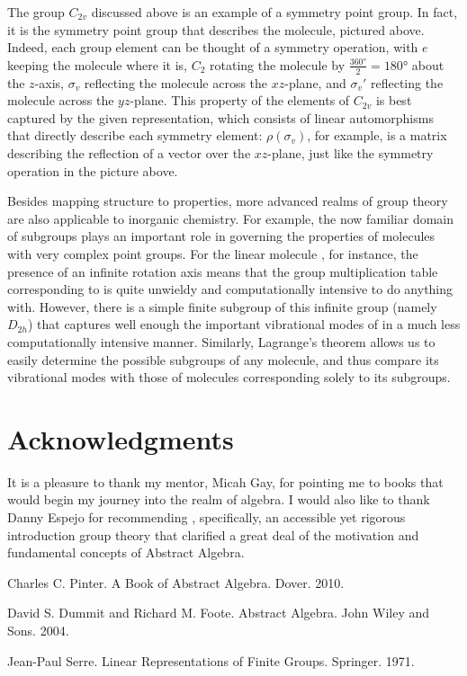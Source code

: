 \documentclass[openany, amssymb, psamsfonts]{amsart}
\theoremstyle{definition}
\numberwithin{equation}{section}
\begin{document}
The group $C_{2v}$ discussed above is an example of a symmetry point group. In fact, it is the symmetry point group that describes the  molecule, pictured above. Indeed, each group element can be thought of a symmetry operation, with $e$ keeping the molecule where it is, $C_2$ rotating the molecule by $\frac{\ang{360}}{2}=\ang{180}$ about the $z$-axis, $\sigma_v$ reflecting the molecule across the $xz$-plane, and $\sigma_v'$ reflecting the molecule across the $yz$-plane. This property of the elements of $C_{2v}$ is best captured by the given representation, which consists of linear automorphisms that directly describe each symmetry element: $\rho(\sigma_v)$, for example, is a matrix describing the reflection of a vector over the $xz$-plane, just like the symmetry operation in the picture above.\par
Besides mapping structure to properties, more advanced realms of group theory are also applicable to inorganic chemistry. For example, the now familiar domain of subgroups plays an important role in governing the properties of molecules with very complex point groups. For the linear molecule , for instance, the presence of an infinite rotation axis means that the group multiplication table corresponding to  is quite unwieldy and computationally intensive to do anything with. However, there is a simple finite subgroup of this infinite group (namely $D_{2h}$) that captures well enough the important vibrational modes of  in a much less computationally intensive manner. Similarly, Lagrange's theorem allows us to easily determine the possible subgroups of any molecule, and thus compare its vibrational modes with those of molecules corresponding solely to its subgroups.



\section*{Acknowledgments}
It is a pleasure to thank my mentor, Micah Gay, for pointing me to books that would begin my journey into the realm of algebra. I would also like to thank Danny Espejo for recommending \cite{pinter}, specifically, an accessible yet rigorous introduction group theory that clarified a great deal of the motivation and fundamental concepts of Abstract Algebra.



\begin{thebibliography}{9}
    Charles C. Pinter.
    A Book of Abstract Algebra.
    Dover. 2010.

    David S. Dummit and Richard M. Foote.
    Abstract Algebra.
    John Wiley and Sons. 2004.
    
    Jean-Paul Serre.
    Linear Representations of Finite Groups.
    Springer. 1971.
\end{thebibliography}
\end{document}
